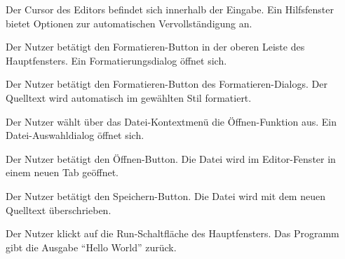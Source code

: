 \documentclass[parskip=full,11pt,twoside]{scrartcl}
\begin{document}


{Der Cursor des Editors befindet sich innerhalb der Eingabe.}
{Ein Hilfsfenster bietet Optionen zur automatischen Vervollständigung an.}



{Der Nutzer betätigt den Formatieren-Button in der oberen Leiste des Hauptfensters.}
{Ein Formatierungsdialog öffnet sich.}

{Der Nutzer betätigt den Formatieren-Button des Formatieren-Dialogs.}
{Der Quelltext wird automatisch im gewählten Stil formatiert.}



{Der Nutzer wählt über das Datei-Kontextmenü die Öffnen-Funktion aus.}
{Ein Datei-Auswahldialog öffnet sich.}

{Der Nutzer betätigt den Öffnen-Button.}
{Die Datei wird im Editor-Fenster in einem neuen Tab geöffnet.}

{Der Nutzer betätigt den Speichern-Button.}
{Die Datei wird mit dem neuen Quelltext überschrieben.}



{Der Nutzer klickt auf die Run-Schaltfläche des Hauptfensters.}
{Das Programm gibt die Ausgabe \enquote{Hello World} zurück.}

\end{document}
